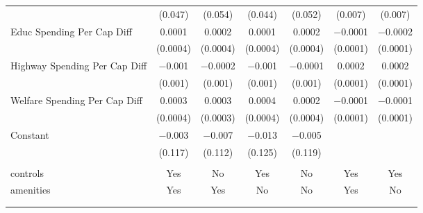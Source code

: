 \begin{table}[!htbp]
\begin{tabular}{@{\extracolsep{5pt}}lcccccc}
  & (0.047) & (0.054) & (0.044) & (0.052) & (0.007) & (0.007) \\ 
  Educ Spending Per Cap Diff & 0.0001 & 0.0002 & 0.0001 & 0.0002 & $-$0.0001 & $-$0.0002 \\ 
  & (0.0004) & (0.0004) & (0.0004) & (0.0004) & (0.0001) & (0.0001) \\ 
  Highway Spending Per Cap Diff & $-$0.001 & $-$0.0002 & $-$0.001 & $-$0.0001 & 0.0002 & 0.0002 \\ 
  & (0.001) & (0.001) & (0.001) & (0.001) & (0.0001) & (0.0001) \\ 
  Welfare Spending Per Cap Diff & 0.0003 & 0.0003 & 0.0004 & 0.0002 & $-$0.0001 & $-$0.0001 \\ 
  & (0.0004) & (0.0003) & (0.0004) & (0.0004) & (0.0001) & (0.0001) \\ 
  Constant & $-$0.003 & $-$0.007 & $-$0.013 & $-$0.005 &  &  \\ 
  & (0.117) & (0.112) & (0.125) & (0.119) &  &  \\ 
 \hline \\[-1.8ex] 
controls & Yes & No & Yes & No & Yes & Yes \\ 
amenities & Yes & Yes & No & No & Yes & No \\ 
\hline \\[-1.8ex] 
\hline 
\hline \\[-1.8ex] 
\end{tabular} 
\end{table} 
